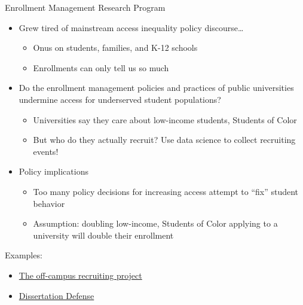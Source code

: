 \documentclass[
  8pt,
  ignorenonframetext,
  dvipsnames]{beamer}
\providecommand{\tightlist}{%
  \setlength{\itemsep}{0pt}\setlength{\parskip}{0pt}}
\let\olditem\item
\renewcommand{\item}{%
  \olditem\vspace{4pt}
}
\begin{document}
\begin{frame}{Enrollment Management Research Program}
\protect\hypertarget{enrollment-management-research-program}{}

\begin{itemize}
\tightlist
\item
  Grew tired of mainstream access inequality policy discourse\ldots{}

  \begin{itemize}
  \tightlist
  \item
    Onus on students, families, and K-12 schools
  \item
    Enrollments can only tell us so much
  \end{itemize}
\end{itemize}

\medskip

\begin{itemize}
\tightlist
\item
  Do the enrollment management policies and practices of public
  universities undermine access for underserved student populations?

  \begin{itemize}
  \tightlist
  \item
    Universities say they care about low-income students, Students of
    Color
  \item
    But who do they actually recruit? Use data science to collect
    recruiting events!
  \end{itemize}
\end{itemize}

\medskip

\begin{itemize}
\tightlist
\item
  Policy implications

  \begin{itemize}
  \tightlist
  \item
    Too many policy decisions for increasing access attempt to ``fix''
    student behavior
  \item
    Assumption: doubling low-income, Students of Color applying to a
    university will double their enrollment
  \end{itemize}
\end{itemize}

Examples:

\begin{itemize}
\tightlist
\item
  \href{https://emraresearch.org/}{The off-campus recruiting project}
\item
  \href{https://ksalazar3.github.io/defense/\#/title}{Dissertation
  Defense}
\end{itemize}

\end{frame}
\end{document}
